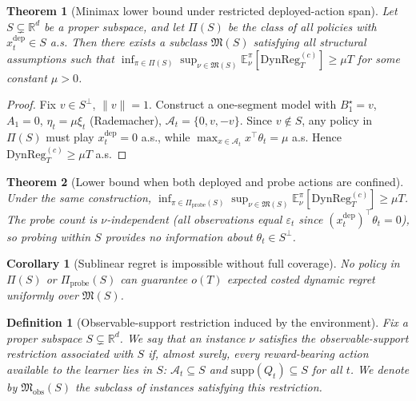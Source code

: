 \documentclass{article}
\newcommand{\R}{\mathbb{R}}
\newcommand{\E}{\mathbb{E}}
\newcommand{\cA}{\mathcal{A}}
\newcommand{\DynReg}{\mathrm{DynReg}}
\newcommand{\supp}{\mathrm{supp}}
\newtheorem{definition}{Definition}
\newtheorem{theorem}{Theorem}
\newtheorem{corollary}{Corollary}
\begin{document}
\begin{theorem}[Minimax lower bound under restricted deployed-action span]
\label{thm:restricted_span_minimax_regret}
Let $S \subsetneq \R^d$ be a proper subspace, and let $\Pi(S)$ be the class of all policies with $x_t^{\mathrm{dep}} \in S$ a.s.
Then there exists a subclass $\mathfrak M(S)$ satisfying all structural assumptions such that
$\inf_{\pi \in \Pi(S)} \sup_{\nu \in \mathfrak M(S)} \E_\nu^\pi[\DynReg_T^{(c)}] \ge \mu T$
for some constant $\mu > 0$.
\end{theorem}

\begin{proof}
Fix $v \in S^\perp$, $\|v\|=1$.
Construct a one-segment model with $B_1^\star = v$, $A_1 = 0$, $\eta_t = \mu \xi_t$ (Rademacher), $\cA_t = \{0, v, -v\}$.
Since $v \notin S$, any policy in $\Pi(S)$ must play $x_t^{\mathrm{dep}} = 0$ a.s., while $\max_{x \in \cA_t} x^\top \theta_t = \mu$ a.s.
Hence $\DynReg_T^{(c)} \ge \mu T$ a.s.
\end{proof}

\begin{theorem}[Lower bound when both deployed and probe actions are confined]
\label{thm:restricted_span_minimax_regret_with_probe}
Under the same construction, $\inf_{\pi \in \Pi_{\mathrm{probe}}(S)} \sup_{\nu \in \mathfrak M(S)} \E_\nu^\pi[\DynReg_T^{(c)}] \ge \mu T$.
The probe count is $\nu$-independent (all observations equal $\varepsilon_t$ since $(x_t^{\mathrm{dep}})^\top \theta_t = 0$), so probing within $S$ provides no information about $\theta_t \in S^\perp$.
\end{theorem}

\begin{corollary}[Sublinear regret is impossible without full coverage]
\label{cor:restricted_span_minimax_sublinear_impossible}
No policy in $\Pi(S)$ or $\Pi_{\mathrm{probe}}(S)$ can guarantee $o(T)$ expected costed dynamic regret uniformly over $\mathfrak M(S)$.
\end{corollary}

\begin{definition}[Observable-support restriction induced by the environment]
\label{def:observable_support_restriction}
Fix a proper subspace $S\subsetneq \R^d$. We say that an instance $\nu$ satisfies the observable-support restriction associated with $S$ if, almost surely, every reward-bearing action available to the learner lies in $S$: $\cA_t \subseteq S$ and $\supp(Q_t)\subseteq S$ for all $t$. We denote by $\mathfrak M_{\mathrm{obs}}(S)$ the subclass of instances satisfying this restriction.
\end{definition}
\end{document}
